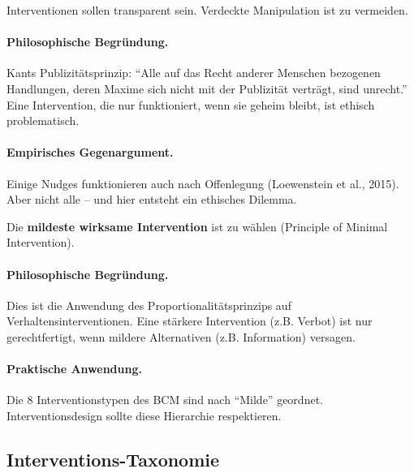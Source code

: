 \begin{axiom}
Interventionen sollen transparent sein. Verdeckte Manipulation ist zu vermeiden.

\paragraph{Philosophische Begründung.}
Kants Publizitätsprinzip: ``Alle auf das Recht anderer Menschen bezogenen Handlungen, deren Maxime sich nicht mit der Publizität verträgt, sind unrecht.'' Eine Intervention, die nur funktioniert, wenn sie geheim bleibt, ist ethisch problematisch.

\paragraph{Empirisches Gegenargument.}
Einige Nudges funktionieren auch nach Offenlegung (Loewenstein et al., 2015). Aber nicht alle -- und hier entsteht ein ethisches Dilemma.
\end{axiom}

\begin{axiom}
Die \textbf{mildeste wirksame Intervention} ist zu wählen (Principle of Minimal Intervention).

\paragraph{Philosophische Begründung.}
Dies ist die Anwendung des Proportionalitätsprinzips auf Verhaltensinterventionen. Eine stärkere Intervention (z.B. Verbot) ist nur gerechtfertigt, wenn mildere Alternativen (z.B. Information) versagen.

\paragraph{Praktische Anwendung.}
Die 8 Interventionstypen des BCM sind nach ``Milde'' geordnet. Interventionsdesign sollte diese Hierarchie respektieren.
\end{axiom}

\subsection{Interventions-Taxonomie}


